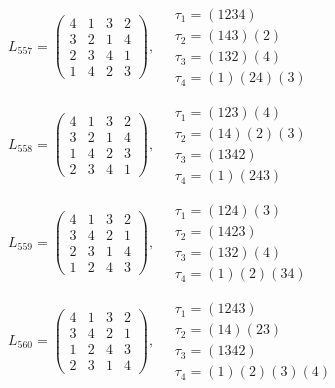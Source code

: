 $L_{557} = \begin{pmatrix} 4 & 1 & 3 & 2 \\ 3 & 2 & 1 & 4 \\ 2 & 3 & 4 & 1 \\ 1 & 4 & 2 & 3 \end{pmatrix}, \quad \begin{matrix} \tau_{1} = (1 2 3 4) \\ \tau_{2} = (1 4 3)(2) \\ \tau_{3} = (1 3 2)(4) \\ \tau_{4} = (1)(2 4)(3) \end{matrix}$

$L_{558} = \begin{pmatrix} 4 & 1 & 3 & 2 \\ 3 & 2 & 1 & 4 \\ 1 & 4 & 2 & 3 \\ 2 & 3 & 4 & 1 \end{pmatrix}, \quad \begin{matrix} \tau_{1} = (1 2 3)(4) \\ \tau_{2} = (1 4)(2)(3) \\ \tau_{3} = (1 3 4 2) \\ \tau_{4} = (1)(2 4 3) \end{matrix}$

$L_{559} = \begin{pmatrix} 4 & 1 & 3 & 2 \\ 3 & 4 & 2 & 1 \\ 2 & 3 & 1 & 4 \\ 1 & 2 & 4 & 3 \end{pmatrix}, \quad \begin{matrix} \tau_{1} = (1 2 4)(3) \\ \tau_{2} = (1 4 2 3) \\ \tau_{3} = (1 3 2)(4) \\ \tau_{4} = (1)(2)(3 4) \end{matrix}$

$L_{560} = \begin{pmatrix} 4 & 1 & 3 & 2 \\ 3 & 4 & 2 & 1 \\ 1 & 2 & 4 & 3 \\ 2 & 3 & 1 & 4 \end{pmatrix}, \quad \begin{matrix} \tau_{1} = (1 2 4 3) \\ \tau_{2} = (1 4)(2 3) \\ \tau_{3} = (1 3 4 2) \\ \tau_{4} = (1)(2)(3)(4) \end{matrix}$

